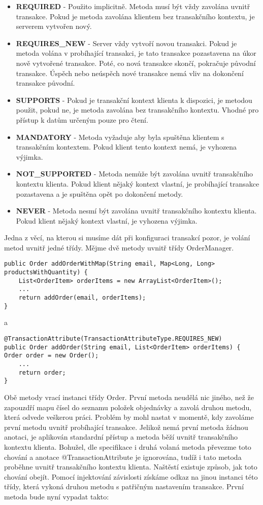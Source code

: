 \documentclass[122pt,oneside]{fithesis}
\begin{document}
\begin{itemize}
  \item {\bf REQUIRED} - Použito implicitně. Metoda musí být vždy zavolána uvnitř transakce. Pokud je metoda zavolána klientem bez transakčního kontextu, je serverem vytvořen nový.
  \item {\bf REQUIRES\_NEW} - Server vždy vytvoří novou transakci. Pokud je metoda volána v probíhající transakci, je tato transakce pozastavena na úkor nově vytvořené transakce. Poté, co nová transakce skončí, pokračuje původní transakce. Úspěch nebo neúspěch nové transakce nemá vliv na dokončení transakce původní.
  \item {\bf SUPPORTS} - Pokud je transakční kontext klienta k dispozici, je metodou použit, pokud ne, je metoda zavolána bez transakčního kontextu. Vhodné pro přístup k datům určeným pouze pro čtení.
  \item {\bf MANDATORY} - Metoda vyžaduje aby byla spuštěna klientem s transakčním kontextem. Pokud klient tento kontext nemá, je vyhozena výjimka.
  \item {\bf NOT\_SUPPORTED} - Metoda nemůže být zavolána uvnitř transakčního kontextu klienta. Pokud klient nějaký kontext vlastní, je probíhající transakce pozastavena a je spuštěna opět po dokončení metody.
  \item {\bf NEVER} - Metoda nesmí být zavolána uvnitř transakčního kontextu klienta. Pokud klient nějaký kontext vlastní, je vyhozena výjimka.
\end{itemize}
Jedna z věcí, na kterou si musíme dát při konfiguraci transakcí pozor, je volání metod uvnitř jedné třídy. Mějme dvě metody uvnitř třídy OrderManager.

\begin{lstlisting}
public Order addOrderWithMap(String email, Map<Long, Long> productsWithQuantity) {
	List<OrderItem> orderItems = new ArrayList<OrderItem>();
	...
	return addOrder(email, orderItems);
}
\end{lstlisting}

a

\begin{lstlisting}
@TransactionAttribute(TransactionAttributeType.REQUIRES_NEW)
public Order addOrder(String email, List<OrderItem> orderItems) {
Order order = new Order();
	...
	return order;
}
\end{lstlisting}

Obě metody vrací instanci třídy Order. První metoda neudělá nic jiného, než že zapouzdří mapu čísel do seznamu položek objednávky a zavolá druhou metodu, která odvede veškerou práci. Problém by mohl nastat v momentě, kdy zavoláme první metodu uvnitř probíhající transakce. Jelikož nemá první metoda žádnou anotaci, je aplikován standardní přístup a metoda běží uvnitř transakčního kontextu klienta. Bohužel, dle specifikace i druhá volaná metoda převezme toto chování a anotace @TransactionAttribute je ignorována, tudíž i tato metoda proběhne uvnitř transakčního kontextu klienta. Naštěstí existuje způsob, jak toto chování obejít. Pomocí injektování závislosti získáme odkaz na jinou instanci této třídy, která vykoná druhou metodu s patřičným nastavením transakce. První metoda bude nyní vypadat takto:
\end{document}
